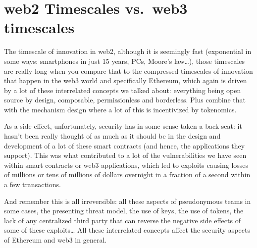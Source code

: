 \section{web2 Timescales vs.~web3
timescales}\label{web2-timescales-vs.-web3-timescales}

The timescale of innovation in web2, although it is seemingly fast
(exponential in some ways: smartphones in just 15 years, PCs, Moore's
law\ldots), those timescales are really long when you compare that to
the compressed timescales of innovation that happen in the web3 world
and specifically Ethereum, which again is driven by a lot of these
interrelated concepts we talked about: everything being open source by
design, composable, permissionless and borderless. Plus combine that
with the mechanism design where a lot of this is incentivized by
tokenomics.

As a side effect, unfortunately, security has in some sense taken a back
seat: it hasn't been really thought of as much as it should be in the
design and development of a lot of these smart contracts (and hence, the
applications they support). This was what contributed to a lot of the
vulnerabilities we have seen within smart contracts or web3
applications, which led to exploits causing losses of millions or tens
of millions of dollars overnight in a fraction of a second within a few
transactions.

And remember this is all irreversible: all these aspects of pseudonymous
teams in some cases, the presenting threat model, the use of keys, the
use of tokens, the lack of any centralized third party that can reverse
the negative side effects of some of these exploits\ldots{} All these
interrelated concepts affect the security aspects of Ethereum and web3
in general.
